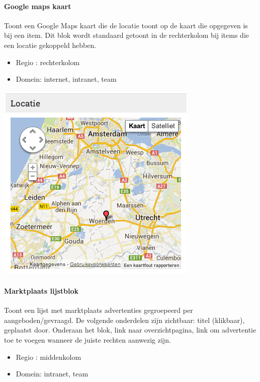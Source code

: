 \paragraph{Google maps kaart}

Toont een Google Maps kaart die de locatie toont op de kaart die opgegeven is bij een item. Dit blok wordt standaard getoont in de rechterkolom bij items die een locatie gekoppeld hebben.

\begin{itemize}
\item Regio : rechterkolom
\item Domein: internet, intranet, team
\end{itemize}

\begin{center}
	\includegraphics[scale=0.5]{img/blokken/googlemaps.png}
\end{center}

\paragraph{Marktplaats lijstblok}

Toont een lijst met marktplaats advertenties gegroepeerd per aangeboden/gevraagd. De volgende onderdelen zijn zichtbaar: titel (klikbaar), geplaatst door. Onderaan het blok, link naar overzichtpagina, link om advertentie toe te voegen wanneer de juiste rechten aanwezig zijn.

\begin{itemize}
\item Regio : middenkolom
\item Domein: intranet, team
\end{itemize}

